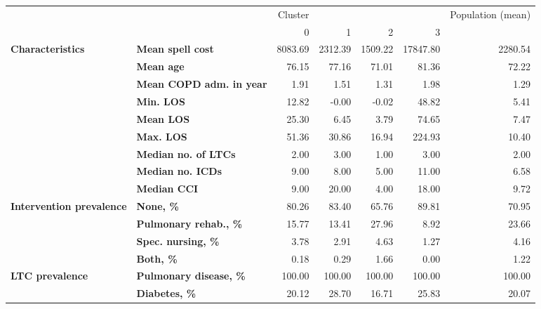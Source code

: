 \begin{tabular}{llrrrrr}
\toprule
               &        &  Cluster &          &          &           & Population (mean) \\
               &        &        0 &        1 &        2 &         3 &                   \\
\midrule
\textbf{Characteristics} & \textbf{Mean spell cost} &  8083.69 &  2312.39 &  1509.22 &  17847.80 &           2280.54 \\
               & \textbf{Mean age} &    76.15 &    77.16 &    71.01 &     81.36 &             72.22 \\
               & \textbf{Mean COPD adm. in year} &     1.91 &     1.51 &     1.31 &      1.98 &              1.29 \\
               & \textbf{Min. LOS} &    12.82 &    -0.00 &    -0.02 &     48.82 &              5.41 \\
               & \textbf{Mean LOS} &    25.30 &     6.45 &     3.79 &     74.65 &              7.47 \\
               & \textbf{Max. LOS} &    51.36 &    30.86 &    16.94 &    224.93 &             10.40 \\
               & \textbf{Median no. of LTCs} &     2.00 &     3.00 &     1.00 &      3.00 &              2.00 \\
               & \textbf{Median no. ICDs} &     9.00 &     8.00 &     5.00 &     11.00 &              6.58 \\
               & \textbf{Median CCI} &     9.00 &    20.00 &     4.00 &     18.00 &              9.72 \\
\textbf{Intervention prevalence} & \textbf{None, \%} &    80.26 &    83.40 &    65.76 &     89.81 &             70.95 \\
               & \textbf{Pulmonary rehab., \%} &    15.77 &    13.41 &    27.96 &      8.92 &             23.66 \\
               & \textbf{Spec. nursing, \%} &     3.78 &     2.91 &     4.63 &      1.27 &              4.16 \\
               & \textbf{Both, \%} &     0.18 &     0.29 &     1.66 &      0.00 &              1.22 \\
\textbf{LTC prevalence} & \textbf{Pulmonary disease, \%} &   100.00 &   100.00 &   100.00 &    100.00 &            100.00 \\
               & \textbf{Diabetes, \%} &    20.12 &    28.70 &    16.71 &     25.83 &             20.07 \\

\end{tabular}
